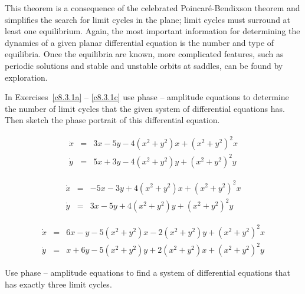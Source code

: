 \documentclass{ximera}
\begin{document}
This theorem is a consequence of the celebrated Poincar\'e-Bendixson theorem
 and simplifies the search for limit 
cycles in the plane; limit cycles must surround at least one equilibrium.  
Again, the most important information for determining the dynamics of a given 
planar differential equation is the number and type of equilibria.  Once the 
equilibria are known, more complicated features, such as periodic 
solutions and stable and unstable orbits at saddles, can be found by 
exploration.

\EXER

\TEXER

\noindent In Exercises~\ref{c8.3.1a} -- \ref{c8.3.1c} use phase -- amplitude 
equations to determine the number of limit cycles that the given system of 
differential equations has.   Then sketch the phase portrait of this 
differential equation.
\begin{exercise} \label{c8.3.1a}
\[
\begin{array}{rcl}
\dot{x} & = &  3x-5y - 4(x^2+y^2)x + (x^2+y^2)^2x\\
\dot{y} & = &  5x+3y - 4(x^2+y^2)y + (x^2+y^2)^2y
\end{array} 
\]
\end{exercise}
\begin{exercise} \label{c8.3.1b}
\[ 
\begin{array}{rcl}
\dot{x} & = &  -5x-3y + 4(x^2+y^2)x + (x^2+y^2)^2x\\
\dot{y} & = &  3x-5y + 4(x^2+y^2)y + (x^2+y^2)^2y
\end{array}
\]
\end{exercise}
\begin{exercise} \label{c8.3.1c}
\[ 
\begin{array}{rcl}
\dot{x} & = &  6x-y - 5(x^2+y^2)x - 2(x^2+y^2)y + (x^2+y^2)^2x\\
\dot{y} & = &  x+6y - 5(x^2+y^2)y + 2(x^2+y^2)x + (x^2+y^2)^2y
\end{array}
\]
\end{exercise}

\begin{exercise} \label{c8.3.4}
Use phase -- amplitude equations to find a system of differential equations 
that has exactly three limit cycles.
\end{exercise}
\end{document}
